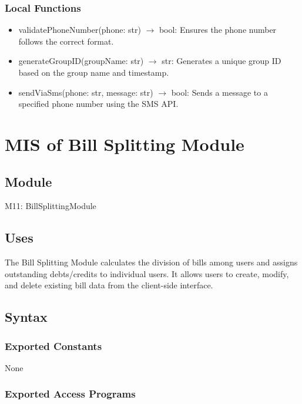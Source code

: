 \documentclass[12pt, titlepage]{article}
\begin{document}
\subsubsection{Local Functions}

\begin{itemize}
  \item validatePhoneNumber(phone: str) $\rightarrow$ bool: Ensures the phone number follows the correct format.
  \item generateGroupID(groupName: str) $\rightarrow$ str: Generates a unique group ID based on the group name and timestamp.
  \item sendViaSms(phone: str, message: str) $\rightarrow$ bool: Sends a message to a specified phone number using the SMS API.
\end{itemize}

\newpage


\section{MIS of Bill Splitting Module} \label{Module}

\subsection{Module}

M11: BillSplittingModule

\subsection{Uses}

The Bill Splitting Module calculates the division of bills among users and assigns outstanding debts/credits to individual users. It allows users to create, modify, and delete existing bill data from the client-side interface.

\subsection{Syntax}

\subsubsection{Exported Constants}
None

\subsubsection{Exported Access Programs}
\end{document}
